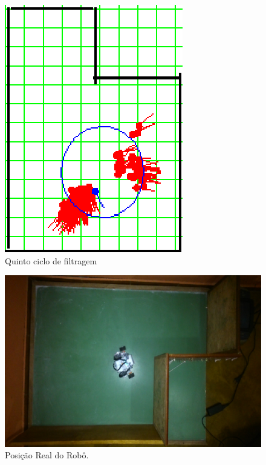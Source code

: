 \begin{figure}[H]
  \centering
  \includegraphics[scale=1]{figuras/cen3_ex1/6.eps}
  \caption[Quinto Ciclo de Filtragem]{Quinto ciclo de filtragem}
  \label{img:cen3_ex1_6}
\end{figure}

\begin{figure}[H]
  \centering
  \includegraphics[scale=1]{figuras/cen3_ex1/real.eps}
  \caption[Posição Real do Robô]{Posição Real do Robô.}
  \label{img:cen3_ex1_real}
\end{figure}
